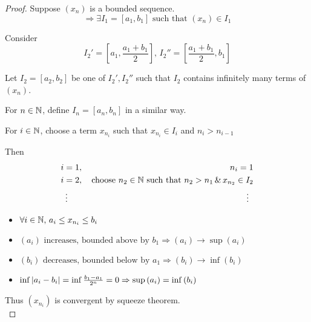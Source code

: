 \documentclass[a4paper,12pt]{article}
\begin{document}
\begin{theorem}
\begin{proof}

            Suppose \((x_n)\) is a bounded sequence.
            \[\Rightarrow \exists I_1=[a_1,b_1] \text{ such that }(x_n)\in I_1\]
            
            Consider \[I_2' = [a_1,\frac{a_1+b_1}{2}], \, I_2'' = [\frac{a_1+b_1}{2}, b_1]\]
            
            Let \(I_2 = [a_2,b_2]\) be one of \(I_2',I_2''\) such that \(I_2\) contains infinitely many terms of \((x_n)\).
            
            For \(n\in\mathbb{N}\), define \(I_n = [a_n,b_n]\) in a similar way.

            For \(i\in\mathbb{N}\), choose a term \(x_{n_i}\) such that \(x_{n_i}\in I_i\) and \(n_i>n_{i-1}\)

            Then \begin{align*}
                & i = 1,\, & n_i = 1\\
                & i = 2,\, & \text{choose }n_2\in\N \text{ such that } n_2>n_1 \,\& \,x_{n_2}\in I_2\\
                & \vdotswithin{=}\notag & \vdotswithin{=}\notag
            \end{align*}

            \begin{itemize}
                \item \(\forall i \in\mathbb{N},\,a_i\le x_{n_i}\le b_i\)
                \item \((a_i) \text{ increases, bounded above by }b_1\Rightarrow (a_i)\rightarrow\sup{(a_i)}\)
                \item \((b_i) \text{ decreases, bounded below by }a_1\Rightarrow (b_i)\rightarrow \inf{(b_i)}\)
                \item \(\inf{\left\lvert a_i-b_i\right\rvert} = \inf{\frac{b_1-a_1}{2^n}} = 0 \Rightarrow \sup{(a_i)} = \inf{(b_i)}\)
            \end{itemize}

            Thus \((x_{n_i})\) is convergent by squeeze theorem.\\
        \end{proof}
    \end{theorem}
\end{document}
